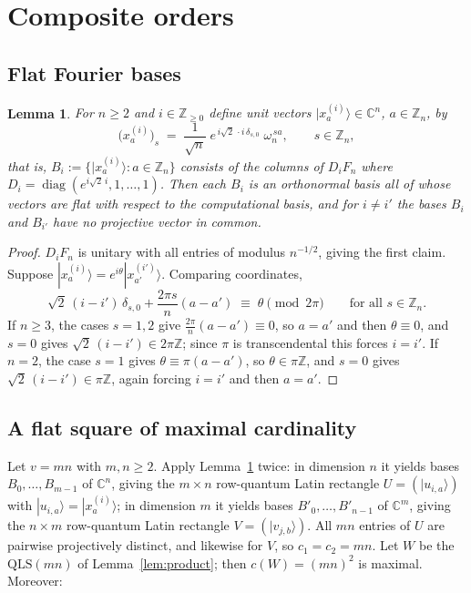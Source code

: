 \documentclass[11pt]{amsart}
\newtheorem{lemma}[theorem]{Lemma}
\theoremstyle{definition}
\newcommand{\C}{\mathbb{C}}
\newcommand{\Z}{\mathbb{Z}}
\newcommand{\ket}[1]{|#1\rangle}
\newcommand{\QLS}{\mathrm{QLS}}
\begin{document}
\section{Composite orders}\label{sec:composite}

\subsection{Flat Fourier bases}

\begin{lemma}\label{lem:flatbases}
For $n\ge2$ and $i\in\Z_{\ge0}$ define unit vectors
$\ket{x^{(i)}_a}\in\C^n$, $a\in\Z_n$, by
\[
\bigl(x^{(i)}_a\bigr)_s\;=\;\frac1{\sqrt n}\;
e^{\,i\sqrt2\,\cdot i\,\delta_{s,0}}\;\omega_n^{\,sa},
\qquad s\in\Z_n,
\]
that is, $B_i:=\{\ket{x^{(i)}_a}:a\in\Z_n\}$ consists of the columns of
$D_iF_n$ where $D_i=\operatorname{diag}(e^{i\sqrt2\,i},1,\dots,1)$.  Then
each $B_i$ is an orthonormal basis all of whose vectors are flat with
respect to the computational basis, and for $i\ne i'$ the bases $B_i$ and
$B_{i'}$ have no projective vector in common.
\end{lemma}

\begin{proof}
$D_iF_n$ is unitary with all entries of modulus $n^{-1/2}$, giving the
first claim.  Suppose $\ket{x^{(i)}_a}=e^{i\theta}\ket{x^{(i')}_{a'}}$.
Comparing coordinates,
\begin{equation}\label{eq:coincide}
\sqrt2\,(i-i')\,\delta_{s,0}+\frac{2\pi s}{n}(a-a')\;\equiv\;\theta
\pmod{2\pi}\qquad\text{for all } s\in\Z_n .
\end{equation}
If $n\ge3$, the cases $s=1,2$ give $\tfrac{2\pi}{n}(a-a')\equiv0$, so
$a=a'$ and then $\theta\equiv0$, and $s=0$ gives
$\sqrt2\,(i-i')\in2\pi\Z$; since $\pi$ is transcendental this forces
$i=i'$.  If $n=2$, the case $s=1$ gives $\theta\equiv\pi(a-a')$, so
$\theta\in\pi\Z$, and $s=0$ gives $\sqrt2\,(i-i')\in\pi\Z$, again forcing
$i=i'$ and then $a=a'$.
\end{proof}

\subsection{A flat square of maximal cardinality}

Let $v=mn$ with $m,n\ge2$.  Apply Lemma~\ref{lem:flatbases} twice: in
dimension $n$ it yields bases $B_0,\dots,B_{m-1}$ of $\C^n$, giving the
$m\times n$ row-quantum Latin rectangle $U=(\ket{u_{i,a}})$ with
$\ket{u_{i,a}}=\ket{x^{(i)}_a}$; in dimension $m$ it yields bases
$B'_0,\dots,B'_{n-1}$ of $\C^m$, giving the $n\times m$ row-quantum Latin
rectangle $V=(\ket{v_{j,b}})$.  All $mn$ entries of $U$ are pairwise
projectively distinct, and likewise for $V$, so $c_1=c_2=mn$.  Let $W$ be
the $\QLS(mn)$ of Lemma~\ref{lem:product}; then $c(W)=(mn)^2$ is maximal.
Moreover:
\end{document}
